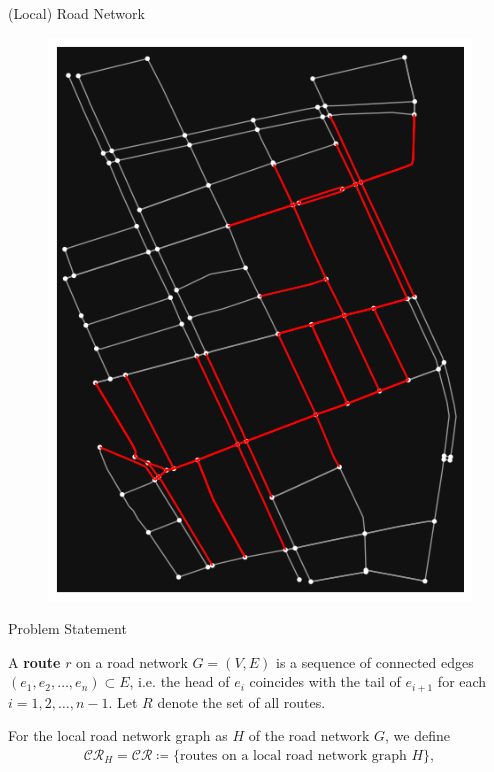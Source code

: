 \documentclass[aspectratio=169, bigfiles, professionalfonts, hyperref={colorlinks=true, allcolors=., urlcolor=blue}]{beamer}
\newcommand{\CR}{\mathcal{CR}}
\def\:={\coloneqq} %
\begin{document}
\begin{frame}{(Local) Road Network}
\begin{figure}
\begin{minipage}{.5\textwidth}
  \includegraphics[scale=.4]{localroadnetwork.png}
  \label{fig:localroadnetwork}
\end{minipage}
\end{figure}

\end{frame}


\begin{frame}{Problem Statement}
\begin{definition}[Route]
A \textbf{route} $r$ on a road network $G=(V,E)$ is a sequence of connected edges $(e_1,e_2,\dots,e_n)\subset E$, i.e. 
the head of $e_i$ coincides with the tail of $e_{i+1}$ for each $i = 1, 2, \dots, n-1$.
Let $R$ denote the set of all routes.
\end{definition}
\begin{definition}
For the local road network graph as $H$ of the road network $G$, we define 
\begin{align*}
    \CR_H = \CR \:= \{ \text{routes on a local road network graph $H$} \},
\end{align*}
\end{definition}
\end{frame}
\end{document}
